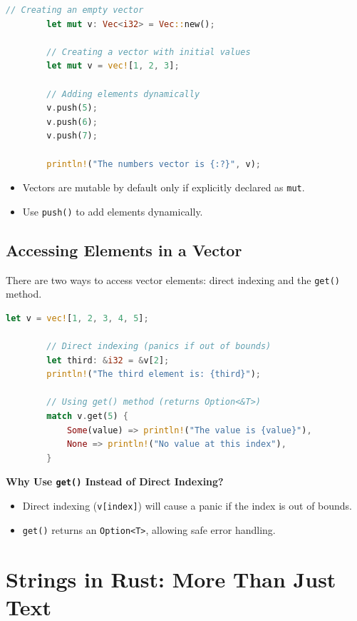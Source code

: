 \documentclass[a4paper,12pt]{report}
\begin{document}
	\begin{lstlisting}[language=Rust]
		// Creating an empty vector
		let mut v: Vec<i32> = Vec::new();  
		
		// Creating a vector with initial values
		let mut v = vec![1, 2, 3]; 
		
		// Adding elements dynamically
		v.push(5);
		v.push(6);
		v.push(7);
		
		println!("The numbers vector is {:?}", v);
	\end{lstlisting}
	
	\begin{takeawaybox}
	\begin{itemize}
		\item Vectors are mutable by default only if explicitly declared as \texttt{mut}.
		\item Use \texttt{push()} to add elements dynamically.
	\end{itemize}
	
	\end{takeawaybox}
	
	\subsection*{Accessing Elements in a Vector}
	
	There are two ways to access vector elements: direct indexing and the \texttt{get()} method.
	
	\begin{lstlisting}[language=Rust]
		let v = vec![1, 2, 3, 4, 5];
		
		// Direct indexing (panics if out of bounds)
		let third: &i32 = &v[2];
		println!("The third element is: {third}");
		
		// Using get() method (returns Option<&T>)
		match v.get(5) {
			Some(value) => println!("The value is {value}"),
			None => println!("No value at this index"),
		}
	\end{lstlisting}
	
	\noindent\textbf{Why Use \texttt{get()} Instead of Direct Indexing?}
	\begin{itemize}
		\item Direct indexing (\texttt{v[index]}) will cause a panic if the index is out of bounds.
		\item \texttt{get()} returns an \texttt{Option<T>}, allowing safe error handling.
	\end{itemize}
	
	\section*{Strings in Rust: More Than Just Text}
	
\end{document}
